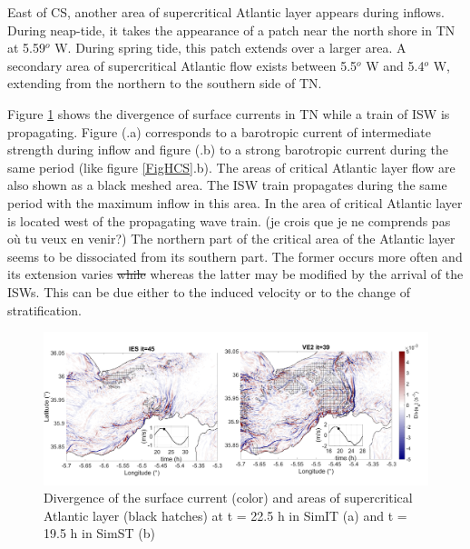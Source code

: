 East of CS, another area of supercritical Atlantic layer appears during inflows.  \color{blue}During neap-tide, \color{black} it takes the appearance of a patch near the north shore in TN at 5.59$^o$ W. During spring tide, this patch extends over a larger area. A secondary area of supercritical Atlantic flow exists between 5.5$^o$ W and 5.4$^o$ W, extending from the northern to the southern side of TN. \color{black} 

Figure \ref{FigISWGBR3D} shows \color{blue} the divergence of surface currents in TN while a train of ISW is propagating. Figure (.a) corresponds to a barotropic current of intermediate strength during inflow and figure (.b) to a strong barotropic current during the same period (like figure \ref{FigHCS}.b). The areas of critical Atlantic layer flow are also shown as a black meshed area. The ISW train propagates during the same period with the maximum inflow in this area. \color{green} In the area of critical Atlantic layer is located \color{black} west of the propagating wave train. (je crois que je ne comprends pas où tu veux en venir?)\color{blue} The northern part of the critical area of the Atlantic layer seems to be dissociated from its southern part. The former occurs more often and its extension varies  \sout{while} whereas the latter may be modified by the arrival of the ISWs. This can be due either to the induced velocity or to the change of stratification.\color{black}

\begin{figure}[!h]
 \centering
\includegraphics[width=\linewidth]{./GBR3D/FigWaveCont.png}
 \caption {Divergence of the surface current (color) and areas of supercritical Atlantic layer (black hatches) at t = 22.5 h in SimIT (a) and t = 19.5 h in SimST (b)}
 \label{FigISWGBR3D}
\end{figure}

